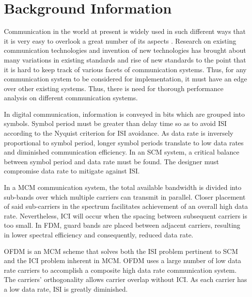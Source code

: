 
\section{Background Information}
Communication in the world at present is widely used in such different ways that it is very easy to overlook a great number of its aspects \cite{hayk}. Research on existing communication technologies and invention of new technologies has brought about many variations in existing standards and rise of new standards to the point that it is hard to keep track of various facets of communication systems. Thus, for any communication system to be considered for implementation, it must have an edge over other existing systems. Thus, there is need for thorough performance analysis on different communication systems.

In digital communication, information is conveyed in bits\cite{ofdm_intro} which are grouped into \gls{symbol}s. Symbol period must be greater than delay time so as to avoid \gls{ISI} according to the Nyquist criterion for \gls{ISI} avoidance\cite{ofdm_intro}. As data rate is inversely proportional to symbol period, longer symbol periods translate to low data rates and diminished communication efficiency. In an \gls{SCM} system, a critical balance between symbol period and data rate must be found. The designer must compromise data rate to mitigate against \gls{ISI}. %

In a \gls{MCM} communication system, the total available bandwidth is divided into sub-bands over which multiple carriers can transmit in parallel. Closer placement of said sub-carriers in the spectrum facilitates achievement of an overall high data rate. Nevertheless, \gls{ICI} will occur when the spacing between subsequent carriers is too small. In \gls{FDM}, guard bands are placed between adjacent carriers, resulting in lower spectral efficiency and consequently, reduced data rate.

\gls{OFDM} is an \gls{MCM} scheme that solves both the \gls{ISI} problem pertinent to \gls{SCM} and the \gls{ICI} problem inherent in \gls{MCM}\cite{ofdm_intro}. \gls{OFDM} uses a large number of low data rate carriers to accomplish a composite high data rate communication system. The carriers' \gls{orthogonal}ity allows carrier overlap without \gls{ICI}. As each carrier has a low data rate, \gls{ISI} is greatly diminished.

